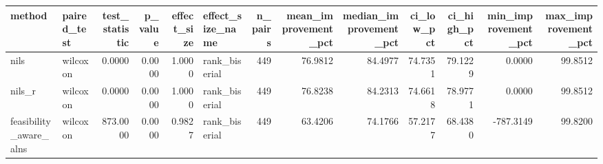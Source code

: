 \begin{tabular}{llrrrlrrrrrrr}
\toprule
method & paired_test & test_statistic & p_value & effect_size & effect_size_name & n_pairs & mean_improvement_pct & median_improvement_pct & ci_low_pct & ci_high_pct & min_improvement_pct & max_improvement_pct \\
\midrule
nils & wilcoxon & 0.0000 & 0.0000 & 1.0000 & rank_biserial & 449 & 76.9812 & 84.4977 & 74.7351 & 79.1229 & 0.0000 & 99.8512 \\
nils_r & wilcoxon & 0.0000 & 0.0000 & 1.0000 & rank_biserial & 449 & 76.8238 & 84.2313 & 74.6618 & 78.9771 & 0.0000 & 99.8512 \\
feasibility_aware_alns & wilcoxon & 873.0000 & 0.0000 & 0.9827 & rank_biserial & 449 & 63.4206 & 74.1766 & 57.2177 & 68.4380 & -787.3149 & 99.8200 \\
\bottomrule
\end{tabular}
